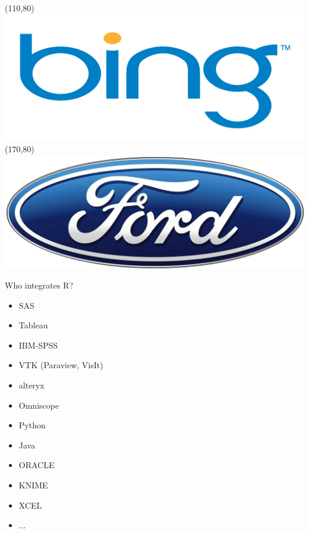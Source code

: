 \begin{frame}
\Put(110,80){\includegraphics[scale=.12]{../common/pics/R_using_logos/bing}}
\Put(170,80){\includegraphics[scale=.29]{../common/pics/R_using_logos/ford}}
\end{frame}

\begin{frame}
  \begin{block}{Who integrates R?}
    \begin{minipage}[t]{4.5cm}
      \begin{itemize}
      \item SAS
      \item Tableau
      \item IBM-SPSS
      \item VTK (Paraview, VisIt)
      \item alteryx
      \end{itemize}
    \end{minipage}
    \begin{minipage}[t]{3cm}
      \begin{itemize}
      \item Omniscope
      \item Python
      \item Java
      \item ORACLE
      \item KNIME
      \end{itemize}
    \end{minipage}
    \begin{minipage}[t]{2.5cm}
      \begin{itemize}
      \item XCEL
      \item $\ldots$
      \end{itemize}
    \end{minipage}
  \end{block}
\end{frame}

